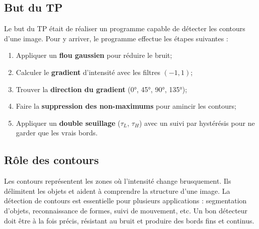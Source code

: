 \documentclass{article}
\begin{document}
\subsection*{But du TP}
Le but du TP était de réaliser un programme capable de détecter les contours d’une image.  
Pour y arriver, le programme effectue les étapes suivantes :
\begin{enumerate}
    \item Appliquer un \textbf{flou gaussien} pour réduire le bruit;
    \item Calculer le \textbf{gradient} d’intensité avec les filtres \((-1,1)\);
    \item Trouver la \textbf{direction du gradient} (0°, 45°, 90°, 135°);
    \item Faire la \textbf{suppression des non-maximums} pour amincir les contours;
    \item Appliquer un \textbf{double seuillage} (\(\tau_L\), \(\tau_H\)) avec un suivi par hystérésis pour ne garder que les vrais bords.
\end{enumerate}

\subsection*{Rôle des contours}
Les contours représentent les zones où l’intensité change brusquement.  
Ils délimitent les objets et aident à comprendre la structure d’une image.  
La détection de contours est essentielle pour plusieurs applications : segmentation d’objets, reconnaissance de formes, suivi de mouvement, etc.  
Un bon détecteur doit être à la fois précis, résistant au bruit et produire des bords fins et continus.
\end{document}
